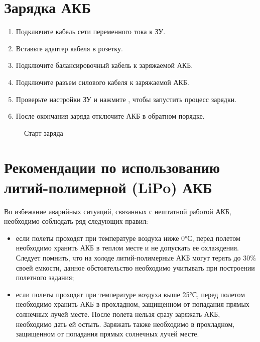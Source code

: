 \documentclass[a4paper,10pt,russian,openany]{sphinxmanual}
\let\sphinxpxdimen\pdfpxdimen\else\newdimen\sphinxpxdimen
\begin{document}
\section{Зарядка АКБ}
\label{\detokenize{charger:id4}}\begin{enumerate}
\def\theenumi{\arabic{enumi}}
\def\labelenumi{\theenumi )}
\makeatletter\def\p@enumii{\p@enumi \theenumi )}\makeatother
\item {} 
Подключите кабель сети переменного тока к ЗУ.

\item {} 
Вставьте адаптер кабеля в розетку.

\item {} 
Подключите балансировочный кабель к заряжаемой АКБ.

\item {} 
Подключите разъем силового кабеля к заряжаемой АКБ.

\item {} 
Проверьте настройки ЗУ и нажмите , чтобы запустить процесс зарядки.

\item {} 
После окончания заряда отключите АКБ в обратном порядке.

\end{enumerate}

\begin{figure}[H]
\centering
\capstart

\noindent\sphinxincludegraphics[width=400\sphinxpxdimen]{{charge9}.png}
\caption{Старт заряда}\label{\detokenize{charger:id19}}\end{figure}


\section{Рекомендации по использованию литий-полимерной (LiPo) АКБ}
\label{\detokenize{charger:lipo}}

Во избежание аварийных ситуаций, связанных с нештатной работой АКБ, необходимо соблюдать ряд следующих правил:
\begin{itemize}
\item {} 
если полеты проходят при температуре воздуха ниже 0°С, перед полетом необходимо хранить АКБ в теплом месте и не допускать ее охлаждения. Следует помнить, что на холоде литий-полимерные АКБ могут терять до 30\% своей емкости, данное обстоятельство необходимо учитывать при построении полетного задания;

\item {} 
если полеты проходят при температуре воздуха выше 25°С, перед полетом необходимо хранить АКБ в прохладном, защищенном от попадания прямых солнечных лучей месте. После полета нельзя сразу заряжать АКБ, необходимо дать ей остыть. Заряжать также необходимо в прохладном, защищенном от попадания прямых солнечных лучей месте.

\end{itemize}
\end{document}
